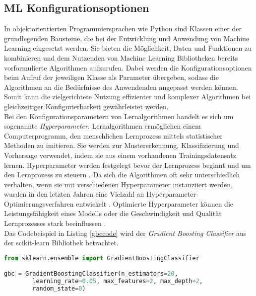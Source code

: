 \documentclass[german,bachelor]{swsLeipzig}
\begin{document}
\subsection{ML Konfigurationsoptionen} \label{ML Konfigurationsoptionen}
In objektorientierten Programmiersprachen wie Python sind Klassen einer der grundlegenden Bausteine, die bei der Entwicklung und Anwendung
von Machine Learning eingesetzt werden.
Sie bieten die Möglichkeit, Daten und Funktionen zu kombinieren und dem Nutzenden von Machine Learning Bibliotheken
bereits vorformulierte Algorithmen aufzurufen.
Dabei werden die Konfigurationsoptionen beim Aufruf der jeweiligen Klasse als Parameter übergeben, sodass die Algorithmen
an die Bedürfnisse des Anwendenden angepasst werden können.
Somit kann die zielgerichtete Nutzung effizienter und komplexer Algorithmen bei gleichzeitiger Konfigurierbarkeit gewährleistet werden. \\
\indent Bei den Konfigurationsparametern von Lernalgorithmen handelt es sich um sogenannte \textit{Hyperparameter}.
Lernalgorithmen ermöglichen einem Computerprogramm, den menschlichen Lernprozess mittels statistischer Methoden zu imitieren.
Sie werden zur Mustererkennung, Klassifizierung und Vorhersage verwendet, indem sie aus einem vorhandenen Trainingsdatensatz
lernen.
Hyperparameter werden festgelegt bevor der Lernprozess beginnt und um den Lernprozess zu steuern \cite[]{hype}.
Da sich die Algorithmen oft sehr unterschiedlich verhalten, wenn sie mit verschiedenen Hyperparameter instanziiert werden,
wurden in den letzten Jahren eine Vielzahl an Hyperparameter-Optimierungsverfahren entwickelt \cite[]{pmlr-v32-hutter14}.
Optimierte Hyperparameter können die Leistungsfähigkeit eines Modells oder die Geschwindigkeit und Qualität Lernprozesses stark beeinflussen \cite[]{hype}.\\
\indent Das Codebeispiel in Listing \ref{gbccode} wird der \textit{Gradient Boosting Classifier} aus der scikit-learn Bibliothek betrachtet.\\

\noindent\begin{minipage}{\linewidth}
\begin{lstlisting}[language=Python, frame=single, label=gbccode, basicstyle=\small, caption={Nutzung der GradientBoostingClassifier-Klasse aus scikit-learn},captionpos=b]
from sklearn.ensemble import GradientBoostingClassifier

gbc = GradientBoostingClassifier(n_estimators=20,
        learning_rate=0.05, max_features=2, max_depth=2,
        random_state=0)
\end{lstlisting}
\end{minipage}
\
\end{document}
